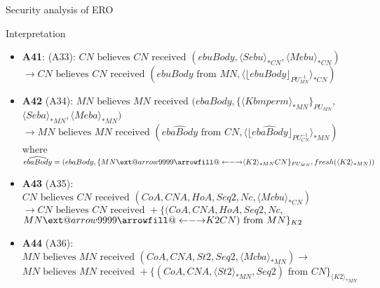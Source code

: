 \documentclass[10pt]{beamer}
\makeatletter
\newcommand\xleftrightarrow[2][]{%
  \ext@arrow 9999{\longleftrightarrowfill@}{#1}{#2}}
\newcommand\longleftrightarrowfill@{%
  \arrowfill@\leftarrow\relbar\rightarrow}
\newcommand{\xtext}[1]{\text{ #1 }}
\makeatother
\begin{document}
\begin{frame}{Security analysis of ERO}
	\begin{block}{Interpretation}
		\begin{itemize}
			\item \textbf{A41}: (A33): {\small $CN \xtext{believes} CN \xtext{received} (ebuBody, \langle Sebu\rangle_{*CN}, \langle Mebu\rangle_{*CN})$ \\ 
			$\rightarrow CN \xtext{believes} CN \xtext{received} (ebuBody \xtext{from} MN, \langle \lfloor ebuBody\rfloor_{PU_{MN}^{-1}}\rangle_{*CN})$}
			\item \textbf{A42} (A34): {\small $MN \xtext{believes} MN \xtext{received} (ebaBody, \{\langle Kbmperm\rangle_{*MN}\}_{PU_{MN}},$ \\$ \langle Seba\rangle_{*MN},\langle Meba\rangle_{*MN})$ \\ 
			$\rightarrow MN \xtext{believes} MN \xtext{received} (\widehat{ebaBody} \xtext{from} CN, \langle \lfloor \widehat{ebaBody}\rfloor_{PU_{CN}^{-1}}\rangle_{*MN})$ \\ where $\widehat{ebaBody}=(ebaBody, \{MN \xleftrightarrow{\langle K2\rangle_{*MN}}CN\}_{PU_{MN}}, fresh(\langle K2\rangle_{*MN}))$}
			\item \textbf{A43} (A35): {\small $CN \xtext{believes} CN \xtext{received} (CoA, CNA, HoA, Seq2, Nc, \langle Mcbu\rangle_{*CN})$\\ 
			$\rightarrow CN \xtext{believes} CN \xtext{received} {+}\{(CoA, CNA, HoA, Seq2, Nc,$\\$ MN \xleftrightarrow{K2}CN) \xtext{from} MN\}_{K2}$}
			\item \textbf{A44} (A36): {\small $MN \xtext{believes} MN \xtext{received} (CoA, CNA, St2, Seq2, \langle Mcba\rangle_{*MN}) \rightarrow $\\ 
			$MN \xtext{believes} MN \xtext{received} {+}\{(CoA, CNA, \langle St2\rangle_{*MN},Seq2) \xtext{from} CN\}_{\langle K2\rangle_{*MN}}$}
		\end{itemize}
	\end{block}
\end{frame}
\end{document}
